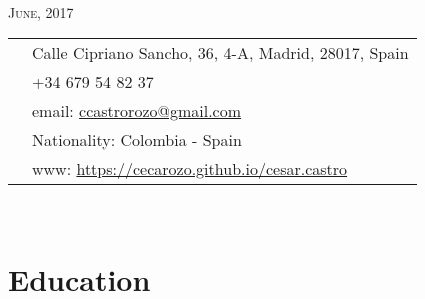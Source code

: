 \documentclass[11pt]{article}\usepackage[]{graphicx}\usepackage[]{color}
\begin{document}
\par{\\
\vspace{5pt}
{\color{headings} \scshape{June, 2017}}\\
\vspace{10pt}}

\colorbox{shade}{{
\begin{tabular}{c|p{13cm}}
\vspace{5pt}\raisebox{-4pt}{\textifsymbol{18}} & Calle Cipriano Sancho, 36, 4-A, Madrid, 28017, Spain\\
\vspace{5pt}\raisebox{-4pt}{\Mobilefone} & +34 679 54 82 37\\
\vspace{5pt}\raisebox{-4pt}{\Letter} & email: \href{mailto:castrorozo@gmail.com}{ccastrorozo@gmail.com} \\
\vspace{5pt}\raisebox{-4pt}{\Aquarius} & Nationality: Colombia - Spain\\
\vspace{5pt}\raisebox{-4pt}{\Mundus} & www: \href{https://cecarozo.github.io/cesar.castro}{https://cecarozo.github.io/cesar.castro}\\
\end{tabular}
}
}\\[10pt]


\section{Education} 
\end{document}
